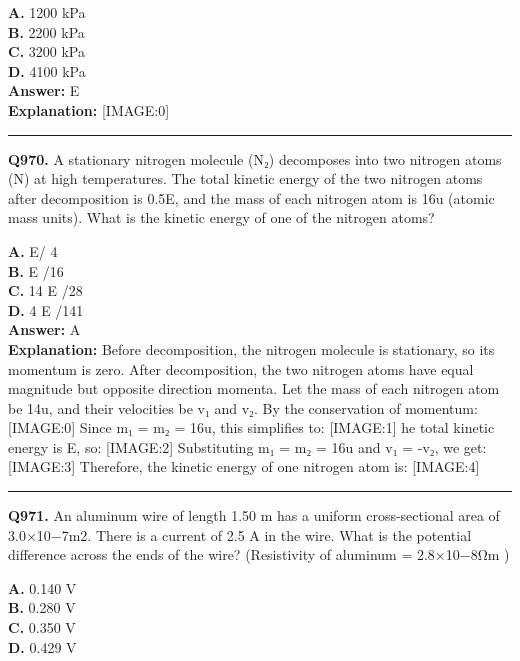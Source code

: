 \documentclass[12pt]{article}
\begin{document}
\textbf{A.} 1200 kPa \\
\textbf{B.} 2200 kPa \\
\textbf{C.} 3200 kPa \\
\textbf{D.} 4100 kPa \\

\textbf{Answer:} E \\
\textbf{Explanation:} [IMAGE:0]

\hrule
\vspace{1em}


\noindent
\textbf{Q970.} A stationary nitrogen molecule (N₂) decomposes into two nitrogen atoms (N) at high temperatures. The total kinetic energy of the two nitrogen atoms after decomposition is 0.5E, and the mass of each nitrogen atom is 16u (atomic mass units). What is the kinetic energy of one of the nitrogen atoms?



\textbf{A.} E/
4 \\
\textbf{B.} E
​/16 \\
\textbf{C.} 14
E
​/28 \\
\textbf{D.} 4
E
​/141 \\

\textbf{Answer:} A \\
\textbf{Explanation:} Before decomposition, the nitrogen molecule is stationary, so its momentum is zero. After decomposition, the two nitrogen atoms have equal magnitude but opposite direction momenta. Let the mass of each nitrogen atom be 14u, and their velocities be v₁ and v₂. By the conservation of momentum:
[IMAGE:0]
Since m₁ = m₂ = 16u, this simplifies to:
[IMAGE:1]
he total kinetic energy is E, so:
[IMAGE:2]
Substituting m₁ = m₂ = 16u and v₁ = -v₂, we get:
[IMAGE:3]
Therefore, the kinetic energy of one nitrogen atom is:
[IMAGE:4]

\hrule
\vspace{1em}


\noindent
\textbf{Q971.} An aluminum wire of length 1.50 m has a uniform cross-sectional area of 3.0×10−7m2. There is a current of 2.5 A in the wire. What is the potential difference across the ends of the wire? (Resistivity of aluminum = 2.8×10−8Ω\cdot m
)



\textbf{A.} 0.140 V \\
\textbf{B.} 0.280 V \\
\textbf{C.} 0.350 V \\
\textbf{D.} 0.429 V \\
\end{document}
